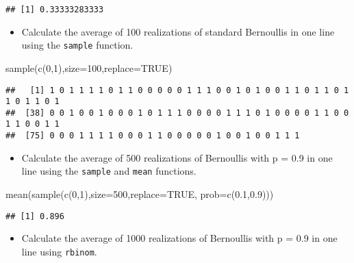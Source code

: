 \documentclass[
]{article}
\newenvironment{Shaded}{\begin{snugshade}}{\end{snugshade}}
\newcommand{\AttributeTok}[1]{\textcolor[rgb]{0.77,0.63,0.00}{#1}}
\newcommand{\ConstantTok}[1]{\textcolor[rgb]{0.00,0.00,0.00}{#1}}
\newcommand{\DecValTok}[1]{\textcolor[rgb]{0.00,0.00,0.81}{#1}}
\newcommand{\FloatTok}[1]{\textcolor[rgb]{0.00,0.00,0.81}{#1}}
\newcommand{\FunctionTok}[1]{\textcolor[rgb]{0.00,0.00,0.00}{#1}}
\newcommand{\NormalTok}[1]{#1}
\providecommand{\tightlist}{%
  \setlength{\itemsep}{0pt}\setlength{\parskip}{0pt}}
\begin{document}
\begin{verbatim}
## [1] 0.33333283333
\end{verbatim}

\begin{itemize}
\tightlist
\item
  Calculate the average of 100 realizations of standard Bernoullis in
  one line using the \texttt{sample} function.
\end{itemize}

\begin{Shaded}
\begin{Highlighting}[]
\FunctionTok{sample}\NormalTok{(}\FunctionTok{c}\NormalTok{(}\DecValTok{0}\NormalTok{,}\DecValTok{1}\NormalTok{),}\AttributeTok{size=}\DecValTok{100}\NormalTok{,}\AttributeTok{replace=}\ConstantTok{TRUE}\NormalTok{)}
\end{Highlighting}
\end{Shaded}

\begin{verbatim}
##   [1] 1 0 1 1 1 1 0 1 1 0 0 0 0 0 1 1 1 0 0 1 0 1 0 0 1 1 0 1 1 0 1 1 0 1 1 0 1
##  [38] 0 0 1 0 0 1 0 0 0 1 0 1 1 1 0 0 0 0 1 1 1 0 1 0 0 0 0 1 1 0 0 1 1 0 0 1 1
##  [75] 0 0 0 1 1 1 1 0 0 0 1 1 0 0 0 0 0 1 0 0 1 0 0 1 1 1
\end{verbatim}

\begin{itemize}
\tightlist
\item
  Calculate the average of 500 realizations of Bernoullis with p = 0.9
  in one line using the \texttt{sample} and \texttt{mean} functions.
\end{itemize}

\begin{Shaded}
\begin{Highlighting}[]
\FunctionTok{mean}\NormalTok{(}\FunctionTok{sample}\NormalTok{(}\FunctionTok{c}\NormalTok{(}\DecValTok{0}\NormalTok{,}\DecValTok{1}\NormalTok{),}\AttributeTok{size=}\DecValTok{500}\NormalTok{,}\AttributeTok{replace=}\ConstantTok{TRUE}\NormalTok{, }\AttributeTok{prob=}\FunctionTok{c}\NormalTok{(}\FloatTok{0.1}\NormalTok{,}\FloatTok{0.9}\NormalTok{)))}
\end{Highlighting}
\end{Shaded}

\begin{verbatim}
## [1] 0.896
\end{verbatim}

\begin{itemize}
\tightlist
\item
  Calculate the average of 1000 realizations of Bernoullis with p = 0.9
  in one line using \texttt{rbinom}.
\end{itemize}
\end{document}
